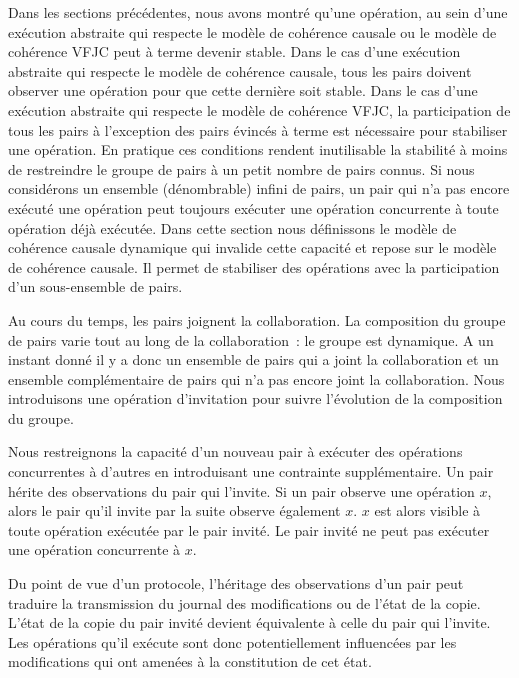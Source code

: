 Dans les sections précédentes, nous avons montré qu'une opération, au sein d'une exécution abstraite qui respecte le modèle de cohérence causale ou le modèle de cohérence \ac{VFJC} peut à terme devenir stable.
Dans le cas d'une exécution abstraite qui respecte le modèle de cohérence causale, tous les pairs doivent observer une opération pour que cette dernière soit stable.
Dans le cas d'une exécution abstraite qui respecte le modèle de cohérence \ac{VFJC}, la participation de tous les pairs à l'exception des pairs évincés à terme est nécessaire pour stabiliser une opération.
En pratique ces conditions rendent inutilisable la stabilité à moins de restreindre le groupe de pairs à un petit nombre de pairs connus.
Si nous considérons un ensemble (dénombrable) infini de pairs, un pair qui n'a pas encore exécuté une opération peut toujours exécuter une opération concurrente à toute opération déjà exécutée.
Dans cette section nous définissons le modèle de cohérence causale dynamique qui invalide cette capacité et repose sur le modèle de cohérence causale.
Il permet de stabiliser des opérations avec la participation d'un sous-ensemble de pairs.

Au cours du temps, les pairs joignent la collaboration.
La composition du groupe de pairs varie tout au long de la collaboration~: le groupe est dynamique.
A un instant donné il y a donc un ensemble de pairs qui a joint la collaboration et un ensemble complémentaire de pairs qui n'a pas encore joint la collaboration.
Nous introduisons une opération d'invitation pour suivre l'évolution de la composition du groupe.

Nous restreignons la capacité d'un nouveau pair à exécuter des opérations concurrentes à d'autres en introduisant une contrainte supplémentaire.
Un pair hérite des observations du pair qui l'invite.
Si un pair observe une opération $x$, alors le pair qu'il invite par la suite observe également $x$.
$x$ est alors visible à toute opération exécutée par le pair invité.
Le pair invité ne peut pas exécuter une opération concurrente à $x$.

Du point de vue d'un protocole, l'héritage des observations d'un pair peut traduire la transmission du journal des modifications ou de l'état de la copie.
L'état de la copie du pair invité devient équivalente à celle du pair qui l'invite.
Les opérations qu'il exécute sont donc potentiellement influencées par les modifications qui ont amenées à la constitution de cet état.

